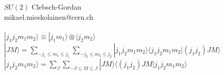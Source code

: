 \documentclass[12pt]{article}
\begin{document}
\huge{$SU(2)$ Clebsch-Gordan} \\ 
\large{mikael.mieskolainen@cern.ch} \\ 
\vspace{5em} \\ 
\small 
$|j_1 j_2 m_1 m_2\rangle \equiv | j_1 m_1 \rangle \otimes | j_2 m_2 \rangle$ 
\vspace{2em} \\ 
$|JM\rangle = \sum_{-j_1 \leq m_1 \leq j_1} \sum_{-j_2 \leq m_2 \leq j_2} |j_1 j_2 m_1 m_2\rangle \langle j_1 j_2 m_1 m_2 | (j_1 j_2) J M\rangle$ 
\vspace{0.5em} \\ 
$|j_1 j_2 m_1 m_2 \rangle = \sum_{J}\sum_{-J \leq M \leq J}  | J M\rangle \langle (j_1 j_2) J M |j_1 j_2 m_1 m_2\rangle$  
\newpage

\end{document}
